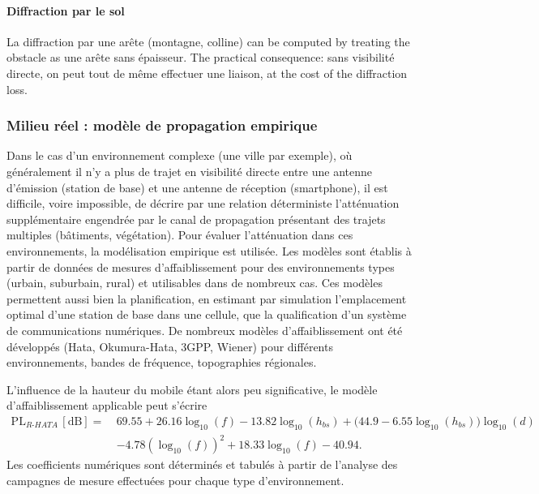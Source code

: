 \paragraph{Diffraction par le sol} La diffraction par une arête (montagne,
colline) can be computed by treating the obstacle as une arête sans épaisseur.
The practical consequence: sans visibilité directe, on peut tout de même
effectuer une liaison, at the cost of the diffraction loss.

\subsubsection{Milieu réel : modèle de propagation empirique}

Dans le cas d'un environnement complexe (une ville par exemple), où
généralement il n'y a plus de trajet en visibilité directe entre une antenne
d'émission (station de base) et une antenne de réception (smartphone), il est
difficile, voire impossible, de décrire par une relation déterministe
l'atténuation supplémentaire engendrée par le canal de propagation présentant
des trajets multiples (bâtiments, végétation). Pour évaluer l'atténuation dans
ces environnements, la modélisation empirique est utilisée. Les modèles sont
établis à partir de données de mesures d'affaiblissement pour des
environnements types (urbain, suburbain, rural) et utilisables dans de nombreux
cas. Ces modèles permettent aussi bien la planification, en estimant par
simulation l'emplacement optimal d'une station de base dans une cellule, que la
qualification d'un système de communications numériques. De nombreux modèles
d'affaiblissement ont été développés (Hata, Okumura-Hata, 3GPP, Wiener) pour
différents environnements, bandes de fréquence, topographies régionales.

\begin{definition}
  L'influence de la hauteur du mobile étant alors peu significative, le modèle
  d'affaiblissement applicable peut s'écrire
  \begin{align*}
    \mathrm{PL}_{R\text{-}HATA}\,[\mathrm{dB}] =\ & 69.55 + 26.16 \log_{10}(f)
      - 13.82 \log_{10}(h_{bs})
      + \bigl(44.9 - 6.55 \log_{10}(h_{bs})\bigr) \log_{10}(d) \\
      & - 4.78 \left(\log_{10}(f)\right)^{2} + 18.33 \log_{10}(f) - 40.94 .
  \end{align*}
  Les coefficients numériques sont déterminés et tabulés à partir de l'analyse
  des campagnes de mesure effectuées pour chaque type d'environnement.
\end{definition}

